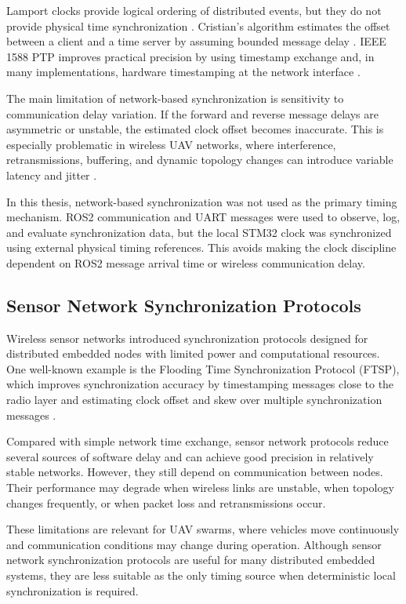 Lamport clocks provide logical ordering of distributed events, but they do not provide physical time synchronization \cite{lamport1978time}. Cristian's algorithm estimates the offset between a client and a time server by assuming bounded message delay \cite{cristian1989probabilistic}. IEEE 1588 PTP improves practical precision by using timestamp exchange and, in many implementations, hardware timestamping at the network interface \cite{ieee1588}.

The main limitation of network-based synchronization is sensitivity to communication delay variation. If the forward and reverse message delays are asymmetric or unstable, the estimated clock offset becomes inaccurate. This is especially problematic in wireless UAV networks, where interference, retransmissions, buffering, and dynamic topology changes can introduce variable latency and jitter \cite{lopez2021uavmesh}.

In this thesis, network-based synchronization was not used as the primary timing mechanism. ROS2 communication and UART messages were used to observe, log, and evaluate synchronization data, but the local STM32 clock was synchronized using external physical timing references. This avoids making the clock discipline dependent on ROS2 message arrival time or wireless communication delay.

\subsection{Sensor Network Synchronization Protocols}

Wireless sensor networks introduced synchronization protocols designed for distributed embedded nodes with limited power and computational resources. One well-known example is the Flooding Time Synchronization Protocol (FTSP), which improves synchronization accuracy by timestamping messages close to the radio layer and estimating clock offset and skew over multiple synchronization messages \cite{maroti2004ftsp}.

Compared with simple network time exchange, sensor network protocols reduce several sources of software delay and can achieve good precision in relatively stable networks. However, they still depend on communication between nodes. Their performance may degrade when wireless links are unstable, when topology changes frequently, or when packet loss and retransmissions occur.

These limitations are relevant for UAV swarms, where vehicles move continuously and communication conditions may change during operation. Although sensor network synchronization protocols are useful for many distributed embedded systems, they are less suitable as the only timing source when deterministic local synchronization is required.

